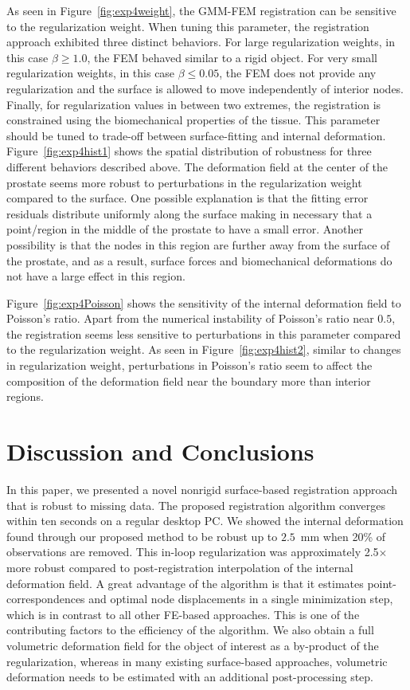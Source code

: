 \documentclass[journal]{IEEEtran}
\begin{document}
As seen in Figure~\ref{fig:exp4weight}, the GMM-FEM registration can be sensitive to the regularization weight. When tuning this parameter, the registration approach exhibited three distinct behaviors. For large regularization weights, in this case $\beta\geq1.0$, the FEM behaved similar to a rigid object. For very small regularization weights, in this case $\beta\leq0.05$, the FEM does not provide any regularization and the surface is allowed to move independently of interior nodes. Finally, for regularization values in between two extremes, the registration is constrained using the biomechanical properties of the tissue.  This parameter should be tuned to trade-off between surface-fitting and internal deformation. Figure~\ref{fig:exp4hist1} shows the spatial distribution of robustness for three different behaviors described above. The deformation field at the center of the prostate seems more robust to perturbations in the regularization weight compared to the surface. One possible explanation is that the fitting error residuals distribute uniformly along the surface making in necessary that a point/region in the middle of the prostate to have a small error. Another possibility is that the nodes in this region are further away from the surface of the prostate, and as a result, surface forces and biomechanical deformations do not have a large effect in this region.

Figure~\ref{fig:exp4Poisson} shows the sensitivity of the internal deformation field to Poisson's ratio. Apart from the numerical instability of Poisson's ratio near $0.5$, the registration seems less sensitive to perturbations in this parameter compared to the regularization weight. As seen in Figure~\ref{fig:exp4hist2}, similar to changes in regularization weight, perturbations in Poisson's ratio seem to affect the composition of the deformation field near the boundary more than interior regions.
\section{Discussion and Conclusions}\label{sec:disc}
In this paper, we presented a novel nonrigid surface-based registration approach that is robust to missing data. The proposed registration algorithm converges within ten seconds on a regular desktop PC. We showed the internal deformation found through our proposed method to be robust up to $2.5$~mm when 20\% of observations are removed. This in-loop regularization was approximately 2.5$\times$ more robust compared to post-registration interpolation of the internal deformation field.  A great advantage of the algorithm is that it estimates point-correspondences and optimal node displacements in a single minimization step, which is in contrast to all other FE-based approaches.  This is one of the contributing factors to the efficiency of the algorithm.  We also obtain a full volumetric deformation field for the object of interest as a by-product of the regularization, whereas in many existing surface-based approaches, volumetric deformation needs to be estimated with an additional post-processing step.
\end{document}
